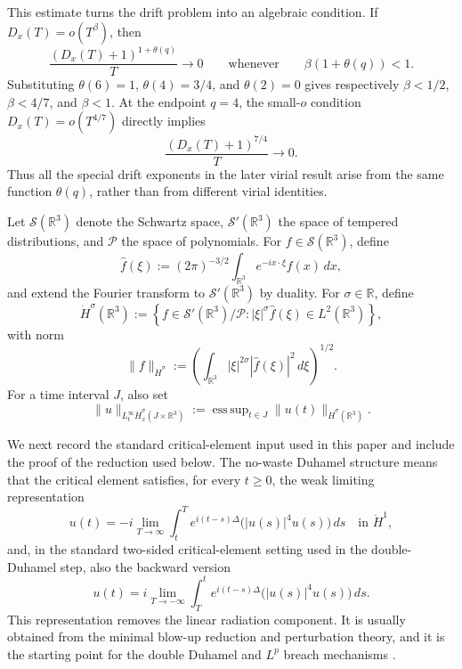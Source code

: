 \documentclass[smallextended,envcountsect,nospthms]{svjour3}
\numberwithin{equation}{section}
\theoremstyle{spbreak}
\theoremstyle{spdefbreak}
\theoremstyle{spdefbreak}
\newcommand{\R}{\mathbb R}
\begin{document}
This estimate turns the drift problem into an algebraic condition. If $D_x(T)=o(T^\beta)$, then
\[
  \frac{(D_x(T)+1)^{1+\theta(q)}}{T}\to0
  \qquad\text{whenever}\qquad
  \beta(1+\theta(q))<1.
\]
Substituting $\theta(6)=1$, $\theta(4)=3/4$, and $\theta(2)=0$ gives respectively $\beta<1/2$, $\beta<4/7$, and $\beta<1$. At the endpoint $q=4$, the small-$o$ condition $D_x(T)=o(T^{4/7})$ directly implies
\[
  \frac{(D_x(T)+1)^{7/4}}{T}\to0.
\]
Thus all the special drift exponents in the later virial result arise from the same function $\theta(q)$, rather than from different virial identities.

Let $\mathcal S(\R^3)$ denote the Schwartz space, $\mathcal S'(\R^3)$ the space of tempered distributions, and $\mathcal P$ the space of polynomials. For $f\in\mathcal S(\R^3)$, define
\begin{equation*}
  \widehat f(\xi):=(2\pi)^{-3/2}\int_{\R^3}e^{-ix\cdot\xi}f(x)\,dx,
\end{equation*}
and extend the Fourier transform to $\mathcal S'(\R^3)$ by duality. For $\sigma\in\R$, define
\begin{equation*}
  \dot H^\sigma(\R^3)
  :=\left\{f\in\mathcal S'(\R^3)/\mathcal P:
  |\xi|^\sigma\widehat f(\xi)\in L^2(\R^3)\right\},
\end{equation*}
with norm
\begin{equation*}
  \|f\|_{\dot H^\sigma}
  :=\left(\int_{\R^3}|\xi|^{2\sigma}|\widehat f(\xi)|^2\,d\xi\right)^{1/2}.
\end{equation*}
For a time interval $J$, also set
\begin{equation*}
  \|u\|_{L_t^\infty\dot H_x^\sigma(J\times\R^3)}
  :=\mathop{\mathrm{ess\,sup}}_{t\in J}\|u(t)\|_{\dot H^\sigma(\R^3)}.
\end{equation*}

We next record the standard critical-element input used in this paper and include the proof of the reduction used below. The no-waste Duhamel structure means that the critical element satisfies, for every $t\ge0$, the weak limiting representation
\begin{equation*}
  u(t)=-i\lim_{T\to\infty}\int_t^T e^{i(t-s)\Delta}\bigl(|u(s)|^4u(s)\bigr)\,ds
  \quad\text{in }\dot H^1,
\end{equation*}
and, in the standard two-sided critical-element setting used in the double-Duhamel step, also the backward version
\begin{equation*}
  u(t)=i\lim_{T\to-\infty}\int_T^t e^{i(t-s)\Delta}\bigl(|u(s)|^4u(s)\bigr)\,ds.
\end{equation*}
This representation removes the linear radiation component. It is usually obtained from the minimal blow-up reduction and perturbation theory, and it is the starting point for the double Duhamel and $L^p$ breach mechanisms \cite{KillipVisan2010,KillipVisan2013,Dodson2019}.
\end{document}
